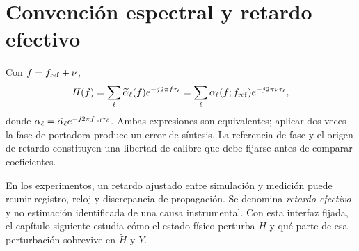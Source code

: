 \section{Convención espectral y retardo efectivo}
\label{sec:phase_conventions}
\label{sec:delay_gauge}

Con $f=f_{\rm ref}+\nu$,
\begin{equation}
H(f)=\sum_\ell\widetilde\alpha_\ell(f)e^{-j2\pi f\tau_\ell}
=\sum_\ell\alpha_\ell(f;f_{\rm ref})e^{-j2\pi\nu\tau_\ell},
\end{equation}
donde
$\alpha_\ell=\widetilde\alpha_\ell e^{-j2\pi f_{\rm ref}\tau_\ell}$.
Ambas expresiones son equivalentes; aplicar dos veces la fase de portadora produce
un error de síntesis. La referencia de fase y el origen de retardo constituyen una
libertad de calibre que debe fijarse antes de comparar coeficientes.

En los experimentos, un retardo ajustado entre simulación y medición puede reunir
registro, reloj y discrepancia de propagación. Se denomina \emph{retardo efectivo}
y no estimación identificada de una causa instrumental. Con esta interfaz fijada,
el capítulo siguiente estudia cómo el estado físico perturba $H$ y qué parte de
esa perturbación sobrevive en $\widetilde H$ y $Y$.
